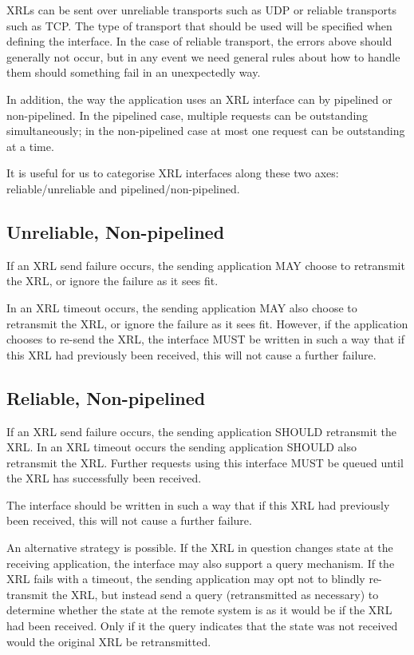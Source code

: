 \documentclass[11pt]{article}
\begin{document}
XRLs can be sent over unreliable transports such as UDP or reliable
transports such as TCP. The type of transport that should be used will
be specified when defining the interface. In the case of reliable
transport, the errors above should generally not occur, but in any
event we need general rules about how to handle them should something
fail in an unexpectedly way.

In addition, the way the application uses an XRL interface can by
pipelined or non-pipelined.  In the pipelined case, multiple requests
can be outstanding simultaneously; in the non-pipelined case at most
one request can be outstanding at a time.

It is useful for us to categorise XRL interfaces along these two axes:
reliable/unreliable and pipelined/non-pipelined.

\subsection*{Unreliable, Non-pipelined}

If an XRL send failure occurs, the sending application MAY choose to
retransmit the XRL, or ignore the failure as it sees fit.  

In an XRL timeout occurs, the sending application MAY also choose to
retransmit the XRL, or ignore the failure as it sees fit.  However, if
the application chooses to re-send the XRL, the interface MUST be
written in such a way that if this XRL had previously been received,
this will not cause a further failure.

\subsection*{Reliable, Non-pipelined}

If an XRL send failure occurs, the sending application SHOULD
retransmit the XRL.  In an XRL timeout occurs the sending application
SHOULD also retransmit the XRL.  Further requests using this interface
MUST be queued until the XRL has successfully been received.

The interface should be written in such a way that if this XRL had
previously been received, this will not cause a further failure.

An alternative strategy is possible.  If the XRL in question changes
state at the receiving application, the interface may also support a
query mechanism.  If the XRL fails with a timeout, the sending
application may opt not to blindly re-transmit the XRL, but instead
send a query (retransmitted as necessary) to determine whether the
state at the remote system is as it would be if the XRL had been
received.  Only if it the query indicates that the state was not
received would the original XRL be retransmitted.
\end{document}
